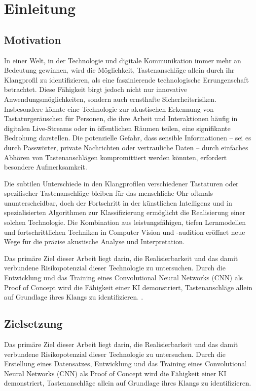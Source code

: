 \chapter{Einleitung}
\label{sec:einl}







\section{Motivation}
In einer Welt, in der Technologie und digitale Kommunikation immer mehr an Bedeutung gewinnen, wird die Möglichkeit, Tastenanschläge allein durch ihr Klangprofil zu identifizieren, als eine faszinierende technologische Errungenschaft betrachtet. Diese Fähigkeit birgt jedoch nicht nur innovative Anwendungsmöglichkeiten, sondern auch ernsthafte Sicherheitsrisiken. Insbesondere könnte eine Technologie zur akustischen Erkennung von Tastaturgeräuschen für Personen, die ihre Arbeit und Interaktionen häufig in digitalen Live-Streams oder in öffentlichen Räumen teilen, eine signifikante Bedrohung darstellen. Die potenzielle Gefahr, dass sensible Informationen – sei es durch Passwörter, private Nachrichten oder vertrauliche Daten – durch einfaches Abhören von Tastenanschlägen kompromittiert werden könnten, erfordert besondere Aufmerksamkeit.

Die subtilen Unterschiede in den Klangprofilen verschiedener Tastaturen oder spezifischer Tastenanschläge bleiben für das menschliche Ohr oftmals ununterscheidbar, doch der Fortschritt in der künstlichen Intelligenz und in spezialisierten Algorithmen zur Klassifizierung ermöglicht die Realisierung einer solchen Technologie. Die Kombination aus leistungsfähigen, tiefen Lernmodellen und fortschrittlichen Techniken in Computer Vision und -audition eröffnet neue Wege für die präzise akustische Analyse und Interpretation.

Das primäre Ziel dieser Arbeit liegt darin, die Realisierbarkeit und das damit verbundene Risikopotenzial dieser Technologie zu untersuchen. Durch die Entwicklung und das Training eines Convolutional Neural Networks (CNN) als Proof of Concept wird die Fähigkeit einer KI demonstriert, Tastenanschläge allein auf Grundlage ihres Klangs zu identifizieren. .




\section{Zielsetzung}
Das primäre Ziel dieser Arbeit liegt darin, die Realisierbarkeit und das damit verbundene Risikopotenzial dieser Technologie zu untersuchen. Durch die Erstellung eines Datensatzes, Entwicklung und das Training eines Convolutional Neural Networks (CNN) als Proof of Concept wird die Fähigkeit einer KI demonstriert, Tastenanschläge allein auf Grundlage ihres Klangs zu identifizieren. 

